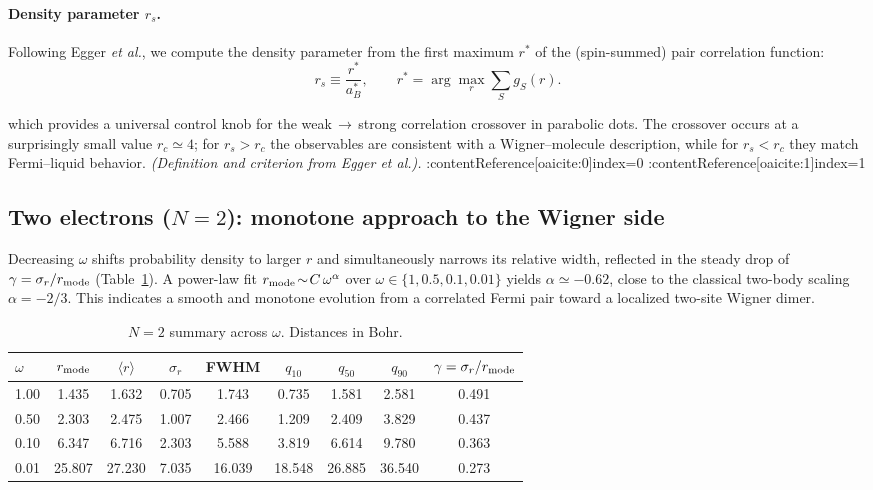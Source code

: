 \paragraph{Density parameter $r_s$.}
Following Egger \emph{et al.}, we compute the density parameter from the first maximum $r^\ast$ of the (spin-summed) pair correlation function:
\[
r_s \equiv \frac{r^\ast}{a_B^\ast}, \qquad 
r^\ast = \arg\max_r \sum_S g_S(r).
\]

which provides a universal control knob for the weak\,$\to$\,strong correlation crossover in parabolic dots.  The crossover occurs at a surprisingly small value $r_c\simeq 4$; for $r_s>r_c$ the observables are consistent with a Wigner–molecule description, while for $r_s<r_c$ they match Fermi–liquid behavior. \emph{(Definition and criterion from Egger \emph{et al.}).} :contentReference[oaicite:0]{index=0} :contentReference[oaicite:1]{index=1}

\subsection{Two electrons ($N=2$): monotone approach to the Wigner side}
Decreasing $\omega$ shifts probability density to larger $r$ and simultaneously narrows its relative width, reflected in the steady drop of $\gamma=\sigma_r/r_{\rm mode}$ (Table~\ref{tab:two_e_summary}).  
A power-law fit $r_{\rm mode}\!\sim\!C\,\omega^{\alpha}$ over $\omega\in\{1,0.5,0.1,0.01\}$ yields $\alpha\simeq-0.62$, close to the classical two-body scaling $\alpha=-2/3$.  
This indicates a smooth and monotone evolution from a correlated Fermi pair toward a localized two-site Wigner dimer.

\begin{table}[H]
\centering
\caption{$N=2$ summary across $\omega$. Distances in Bohr.}
\label{tab:two_e_summary}
\begin{tabular}{lcccccccc}
\toprule
$\omega$ 
& $r_{\rm mode}$ 
& $\langle r\rangle$ 
& $\sigma_r$ 
& FWHM 
& $q_{10}$ 
& $q_{50}$ 
& $q_{90}$ 
& $\gamma=\sigma_r/r_{\rm mode}$ \\
\midrule
1.00 & 1.435 & 1.632 & 0.705 & 1.743 & 0.735 & 1.581 & 2.581 & 0.491 \\
0.50 & 2.303 & 2.475 & 1.007 & 2.466 & 1.209 & 2.409 & 3.829 & 0.437 \\
0.10 & 6.347 & 6.716 & 2.303 & 5.588 & 3.819 & 6.614 & 9.780 & 0.363 \\
0.01 & 25.807 & 27.230 & 7.035 & 16.039 & 18.548 & 26.885 & 36.540 & 0.273 \\
\bottomrule
\end{tabular}
\end{table}

